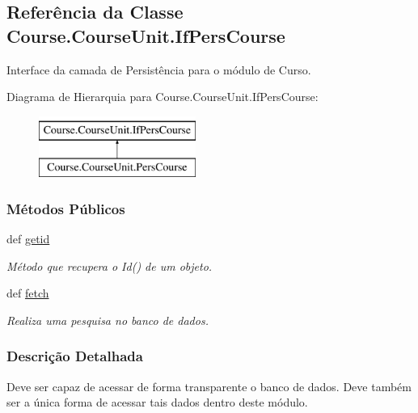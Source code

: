 \hypertarget{classCourse_1_1CourseUnit_1_1IfPersCourse}{\subsection{Referência da Classe Course.\-Course\-Unit.\-If\-Pers\-Course}
\label{classCourse_1_1CourseUnit_1_1IfPersCourse}
}


Interface da camada de Persistência para o módulo de Curso.  


Diagrama de Hierarquia para Course.\-Course\-Unit.\-If\-Pers\-Course\-:\begin{figure}[H]
\begin{center}
\leavevmode
\includegraphics[height=2.000000cm]{d0/d62/classCourse_1_1CourseUnit_1_1IfPersCourse}
\end{center}
\end{figure}
\subsubsection*{Métodos Públicos}
\begin{DoxyCompactItemize}
\item 
def \hyperlink{classCourse_1_1CourseUnit_1_1IfPersCourse_addc6cb006b42968019daf0dcdb8bde9b}{getid}
\begin{DoxyCompactList}\small\item\em Método que recupera o Id() de um objeto. \end{DoxyCompactList}\item 
def \hyperlink{classCourse_1_1CourseUnit_1_1IfPersCourse_adcd2e66255b773b6a196bafefdc851e8}{fetch}
\begin{DoxyCompactList}\small\item\em Realiza uma pesquisa no banco de dados. \end{DoxyCompactList}\end{DoxyCompactItemize}


\subsubsection{Descrição Detalhada}
Deve ser capaz de acessar de forma transparente o banco de dados. Deve também ser a única forma de acessar tais dados dentro deste módulo. 

